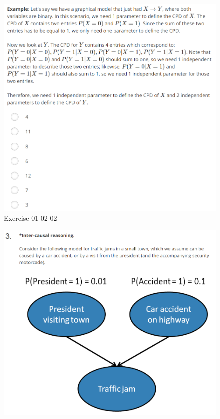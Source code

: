 \documentclass[12pt]{article}
\numberwithin{equation}{section}
\begin{document}
\begin{figure}[H]
	\includegraphics[width=\linewidth]{PGMpics/01-02-02-2.png}
	\caption{Exercise 01-02-02}
	\label{fig:01-02-02-2}
\end{figure}
\begin{figure}[H]
	\includegraphics[width=\linewidth]{PGMpics/01-02-03-1.png}
	\label{fig:01-02-03-1}
\end{figure}
\end{document}

